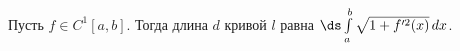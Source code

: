 \label{DDK}
    	Пусть $f\in C^1[a,b]$. Тогда длина $d$ кривой $l$ равна $\ds\int\limits_a^b\sqrt{1+f'^2(x)}\,dx$.
    